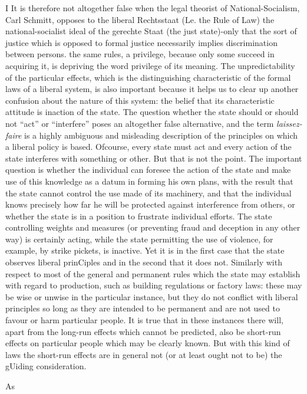 \documentclass[11pt,openany]{book}
\begin{document}
I It is therefore not altogether false when the legal theorist of National-Socialism, Carl Schmitt, opposes to the liberal Rechtsstaat (Le. the Rule of Law) the national-socialist ideal of the gerechte Staat (the just state)-only that the sort of justice which is opposed to formal justice necessarily implies discrimination between persons. the same rules, a privilege, because only some succeed in acquiring it, is depriving the word privilege of its meaning. The unpredictability of the particular effects, which is the distinguishing characteristic of the formal laws of a liberal system, is also important because it helps us to clear up another confusion about the nature of this system: the belief that its characteristic attitude is inaction of the state. The question whether the state should or should not ``act'' or ``interfere'' poses an altogether false alternative, and the term \emph{laissez-faire} is a highly ambiguous and misleading description of the principles on which a liberal policy is based. Ofcourse, every state must act and every action of the state interferes with something or other. But that is not the point. The important question is whether the individual can foresee the action of the state and make use of this knowledge as a datum in forming his own plans, with the result that the state cannot control the use made of its machinery, and that the individual knows precisely how far he will be protected against interference from others, or whether the state is in a position to frustrate individual efforts. The state controlling weights and measures (or preventing fraud and deception in any other way) is certainly acting, while the state permitting the use of violence, for example, by strike pickets, is inactive. Yet it is in the first case that the state observes liberal prinCiples and in the second that it does not. Similarly with respect to most of the general and permanent rules which the state may establish with regard to production, such as building regulations or factory laws: these may be wise or unwise in the particular instance, but they do not conflict with liberal principles so long as they are intended to be permanent and are not used to favour or harm particular people. It is true that in these instances there will, apart from the long-run effects which cannot be predicted, also be short-run effects on particular people which may be clearly known. But with this kind of laws the short-run effects are in general not (or at least ought not to be) the gUiding consideration.

As
\end{document}
